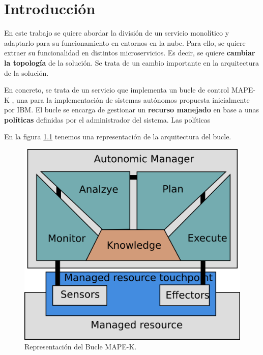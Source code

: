 
\chapter{Introducción}


En este trabajo se quiere abordar la división de un servicio monolítico y adaptarlo para su funcionamiento en entornos en la nube. Para ello, se quiere extraer su funcionalidad en distintos microservicios. Es decir, se quiere \textbf{cambiar la topología} de la solución. Se trata de un cambio importante en la arquitectura de la solución.


En concreto, se trata de un servicio que implementa un bucle de control MAPE-K \cite{ArchitecturalBlueprintAutonomic2006, fonsServiciosAdaptivereadyPara2021}, una para la implementación de sistemas autónomos propuesta inicialmente por IBM. El bucle se encarga de gestionar un \textbf{recurso manejado} en base a unas \textbf{políticas} definidas por el administrador del sistema. Las políticas

En la figura \ref{fig:bucle-mapek} tenemos una representación de la arquitectura del bucle.

\begin{figure}[h]
  \centering
  \includegraphics{01_introduccion/images/bucle-mape-k.png}
  \caption[Representación del Bucle MAPE-K]{Representación del Bucle MAPE-K.\footnotemark}
  \label{fig:bucle-mapek}
\end{figure}

